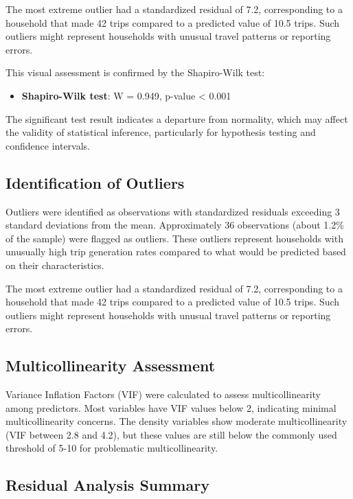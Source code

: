 \documentclass[12pt]{article}
\begin{document}
The most extreme outlier had a standardized residual of 7.2, corresponding to a household that made 42 trips compared to a predicted value of 10.5 trips. Such outliers might represent households with unusual travel patterns or reporting errors. 

This visual assessment is confirmed by the Shapiro-Wilk test:

\begin{itemize}
    \item \textbf{Shapiro-Wilk test}: W = 0.949, p-value < 0.001
\end{itemize}

The significant test result indicates a departure from normality, which may affect the validity of statistical inference, particularly for hypothesis testing and confidence intervals.

\subsection{Identification of Outliers}

Outliers were identified as observations with standardized residuals exceeding 3 standard deviations from the mean. Approximately 36 observations (about 1.2\% of the sample) were flagged as outliers. These outliers represent households with unusually high trip generation rates compared to what would be predicted based on their characteristics.

The most extreme outlier had a standardized residual of 7.2, corresponding to a household that made 42 trips compared to a predicted value of 10.5 trips. Such outliers might represent households with unusual travel patterns or reporting errors.

\subsection{Multicollinearity Assessment}

Variance Inflation Factors (VIF) were calculated to assess multicollinearity among predictors. Most variables have VIF values below 2, indicating minimal multicollinearity concerns. The density variables show moderate multicollinearity (VIF between 2.8 and 4.2), but these values are still below the commonly used threshold of 5-10 for problematic multicollinearity.

\subsection{Residual Analysis Summary}
\end{document}
